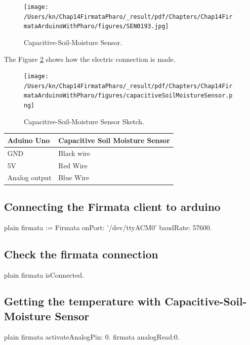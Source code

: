 \documentclass[10pt,twoside,english]{_support/latex/sbabook/sbabook}
\begin{document}
\begin{figure}

\begin{center}
\texttt{[image: /Users/kn/Chap14FirmataPharo/\_result/pdf/Chapters/Chap14FirmataArduinoWithPharo/figures/SEN0193.jpg]}\caption{Capacitive-Soil-Moisture Sensor.\label{Capacitive-Soil-Moisture Sensor}}\end{center}
\end{figure}


The Figure \ref{Capacitive-Soil-Moisture Sensor Sketch} shows how the electric connection is made.


\begin{figure}

\begin{center}
\texttt{[image: /Users/kn/Chap14FirmataPharo/\_result/pdf/Chapters/Chap14FirmataArduinoWithPharo/figures/capacitiveSoilMoistureSensor.png]}\caption{Capacitive-Soil-Moisture Sensor Sketch.\label{Capacitive-Soil-Moisture Sensor Sketch}}\end{center}
\end{figure}


\begin{tabular}{ll}
\toprule
\textbf{Aduino Uno} & \textbf{Capacitive Soil Moisture Sensor} \\
\midrule
GND & Black wire \\
5V & Red Wire \\
Analog output & Blue Wire \\
\bottomrule
\end{tabular}
\subsection{Connecting the Firmata client to arduino}
\begin{displaycode}{plain}
  firmata := Firmata onPort: '/dev/ttyACM0' baudRate: 57600.
\end{displaycode}
\subsection{Check the firmata connection}
\begin{displaycode}{plain}
  firmata isConnected.
\end{displaycode}
\subsection{Getting the temperature with Capacitive-Soil-Moisture Sensor}
\begin{displaycode}{plain}
  firmata activateAnalogPin: 0.
  firmata analogRead:0.
\end{displaycode}
\end{document}

